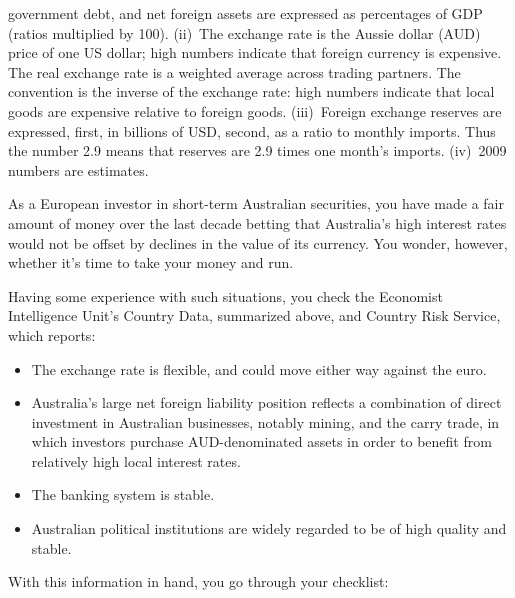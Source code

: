 \documentclass[letterpaper,12pt]{exam}
\begin{document}
\begin{questions}
{government debt, and net foreign assets
are expressed as percentages of GDP (ratios multiplied by 100).
(ii)~The exchange rate is the Aussie dollar (AUD) price
of one US dollar;
high numbers indicate that foreign currency is expensive.
The real exchange rate is a weighted average across trading partners.
The convention is the inverse of the exchange rate:
high numbers indicate that local goods are expensive relative to foreign
goods.
(iii)~Foreign exchange reserves are expressed, first,
in billions of USD, second,
as a ratio to monthly imports.
Thus the number 2.9 means that reserves are 2.9 times one
month's imports.
(iv)~2009 numbers are estimates.}

As a European investor in short-term Australian securities,
you have made a fair amount of money over the last decade
betting that Australia's high interest rates would not
be offset by declines in the value of its currency.
You wonder, however, whether it's time to take your money
and run.

Having some experience with such situations,
you check the Economist Intelligence Unit's Country Data,
summarized above,
and Country Risk Service,
which reports:
%
\begin{itemize}
\item The exchange rate is flexible, and could move either way against
the euro.
\item Australia's large net foreign liability position reflects
a combination of direct investment in Australian businesses,
notably mining,
and the carry trade,
in which investors purchase AUD-denominated assets
in order to benefit from relatively high local interest rates.
\item The banking system is stable.
\item Australian political institutions are widely regarded to be
of high quality and stable.
\end{itemize}

With this information in hand, you go through your checklist:
%
\end{questions}
\end{document}
